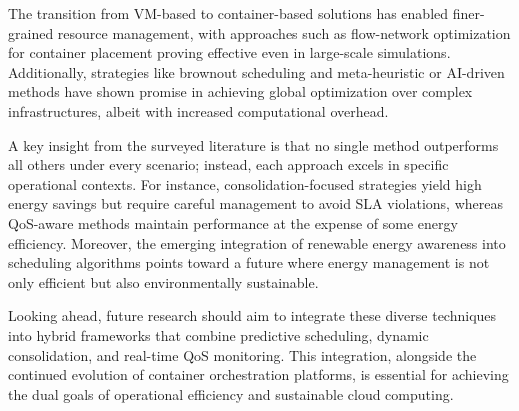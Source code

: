 \documentclass[runningheads]{llncs}
\begin{document}
The transition from VM-based to container-based solutions has enabled finer-grained resource management, with approaches such as flow-network optimization for container placement proving effective even in large-scale simulations\cite{hu_concurrent_2020}. Additionally, strategies like brownout scheduling\cite{xu_energy_2016} and meta-heuristic or AI-driven methods\cite{tan_hybrid_2019,shi_energy-aware_2018} have shown promise in achieving global optimization over complex infrastructures, albeit with increased computational overhead.

A key insight from the surveyed literature is that no single method outperforms all others under every scenario; instead, each approach excels in specific operational contexts. For instance, consolidation-focused strategies yield high energy savings but require careful management to avoid SLA violations, whereas QoS-aware methods maintain performance at the expense of some energy efficiency\cite{li_sla-aware_2018}. Moreover, the emerging integration of renewable energy awareness into scheduling algorithms\cite{kumar_renewable_2019} points toward a future where energy management is not only efficient but also environmentally sustainable.

Looking ahead, future research should aim to integrate these diverse techniques into hybrid frameworks that combine predictive scheduling, dynamic consolidation, and real-time QoS monitoring. This integration, alongside the continued evolution of container orchestration platforms, is essential for achieving the dual goals of operational efficiency and sustainable cloud computing.



\end{document}
